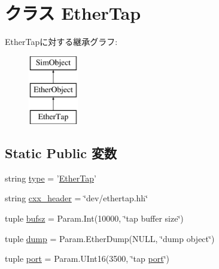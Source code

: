 \hypertarget{classEthernet_1_1EtherTap}{
\section{クラス EtherTap}
\label{classEthernet_1_1EtherTap}
}
EtherTapに対する継承グラフ:\begin{figure}[H]
\begin{center}
\leavevmode
\includegraphics[height=3cm]{classEthernet_1_1EtherTap}
\end{center}
\end{figure}
\subsection*{Static Public 変数}
\begin{DoxyCompactItemize}
\item 
string \hyperlink{classEthernet_1_1EtherTap_acce15679d830831b0bbe8ebc2a60b2ca}{type} = '\hyperlink{classEthernet_1_1EtherTap}{EtherTap}'
\item 
string \hyperlink{classEthernet_1_1EtherTap_a17da7064bc5c518791f0c891eff05fda}{cxx\_\-header} = \char`\"{}dev/ethertap.hh\char`\"{}
\item 
tuple \hyperlink{classEthernet_1_1EtherTap_ab5be077942ce51d482768cedd305ebc8}{bufsz} = Param.Int(10000, \char`\"{}tap buffer size\char`\"{})
\item 
tuple \hyperlink{classEthernet_1_1EtherTap_aef8d0e67d5fcd75abc7d08ee1952b0de}{dump} = Param.EtherDump(NULL, \char`\"{}dump object\char`\"{})
\item 
tuple \hyperlink{classEthernet_1_1EtherTap_a1aadf525515ecfcf662c2aa51a503763}{port} = Param.UInt16(3500, \char`\"{}tap \hyperlink{classEthernet_1_1EtherTap_a1aadf525515ecfcf662c2aa51a503763}{port}\char`\"{})
\end{DoxyCompactItemize}


